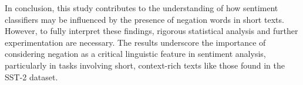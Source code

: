 \documentclass{article}
\begin{document}
In conclusion, this study contributes to the understanding of how sentiment classifiers may be influenced by the presence of negation words in short texts. However, to fully interpret these findings, rigorous statistical analysis and further experimentation are necessary. The results underscore the importance of considering negation as a critical linguistic feature in sentiment analysis, particularly in tasks involving short, context-rich texts like those found in the SST-2 dataset.
\end{document}
